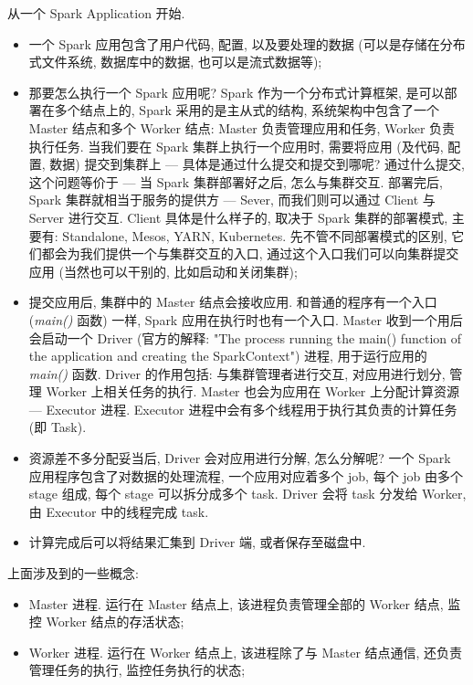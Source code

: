 从一个 Spark Application 开始. 
\begin{itemize}
	\item 一个 Spark 应用包含了用户代码, 配置, 以及要处理的数据 (可以是存储在分布式文件系统, 数据库中的数据, 也可以是流式数据等);
	
	\item 那要怎么执行一个 Spark 应用呢? Spark 作为一个分布式计算框架, 是可以部署在多个结点上的, Spark 采用的是主从式的结构, 系统架构中包含了一个 Master 结点和多个 Worker 结点: Master 负责管理应用和任务, Worker 负责执行任务. 当我们要在 Spark 集群上执行一个应用时, 需要将应用 (及代码, 配置, 数据) 提交到集群上 --- 具体是通过什么提交和提交到哪呢? 通过什么提交, 这个问题等价于 --- 当 Spark 集群部署好之后, 怎么与集群交互. 部署完后, Spark 集群就相当于服务的提供方 --- Sever, 而我们则可以通过 Client 与 Server 进行交互. Client 具体是什么样子的, 取决于 Spark 集群的部署模式, 主要有: Standalone, Mesos, YARN, Kubernetes. 先不管不同部署模式的区别, 它们都会为我们提供一个与集群交互的入口, 通过这个入口我们可以向集群提交应用 (当然也可以干别的, 比如启动和关闭集群);
	
	\item 提交应用后, 集群中的 Master 结点会接收应用. 和普通的程序有一个入口 (\textit{main()} 函数) 一样, Spark 应用在执行时也有一个入口. Master 收到一个用后会启动一个 Driver (官方的解释: "The process running the main() function of the application and creating the SparkContext") 进程, 用于运行应用的 \textit{main()} 函数. Driver 的作用包括: 与集群管理者进行交互, 对应用进行划分, 管理 Worker 上相关任务的执行. Master 也会为应用在 Worker 上分配计算资源 --- Executor 进程. Executor 进程中会有多个线程用于执行其负责的计算任务 (即 Task). 
	
	\item 资源差不多分配妥当后, Driver 会对应用进行分解, 怎么分解呢? 一个 Spark 应用程序包含了对数据的处理流程, 一个应用对应着多个 job, 每个 job 由多个 stage 组成, 每个 stage 可以拆分成多个 task. Driver 会将 task 分发给 Worker, 由 Executor 中的线程完成 task. 
	
	\item 计算完成后可以将结果汇集到 Driver 端, 或者保存至磁盘中.
\end{itemize}

上面涉及到的一些概念:

\begin{itemize}
	\item Master 进程. 运行在 Master 结点上, 该进程负责管理全部的 Worker 结点, 监控 Worker 结点的存活状态;
	
	\item Worker 进程. 运行在 Worker 结点上, 该进程除了与 Master 结点通信, 还负责管理任务的执行, 监控任务执行的状态;
\end{itemize}
 
